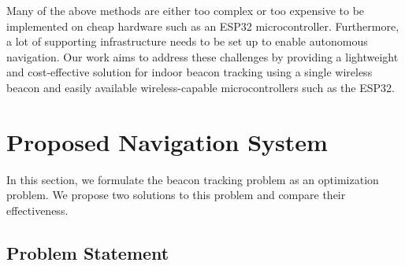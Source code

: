 \documentclass[conference]{IEEEtran}
\begin{document}
Many of the above methods are either too complex or too expensive to be
implemented on cheap hardware such as an ESP32 microcontroller. Furthermore, a
lot of supporting infrastructure needs to be set up to enable autonomous
navigation. Our work aims to address these challenges by providing a lightweight
and cost-effective solution for indoor beacon tracking using a single wireless
beacon and easily available wireless-capable microcontrollers such as the ESP32.

\section{Proposed Navigation System}
\label{sec:proposed-system}

In this section, we formulate the beacon tracking problem as an optimization
problem. We propose two solutions to this problem and compare their effectiveness.


\subsection{Problem Statement}
\label{subsec:problem-statement}
\end{document}
